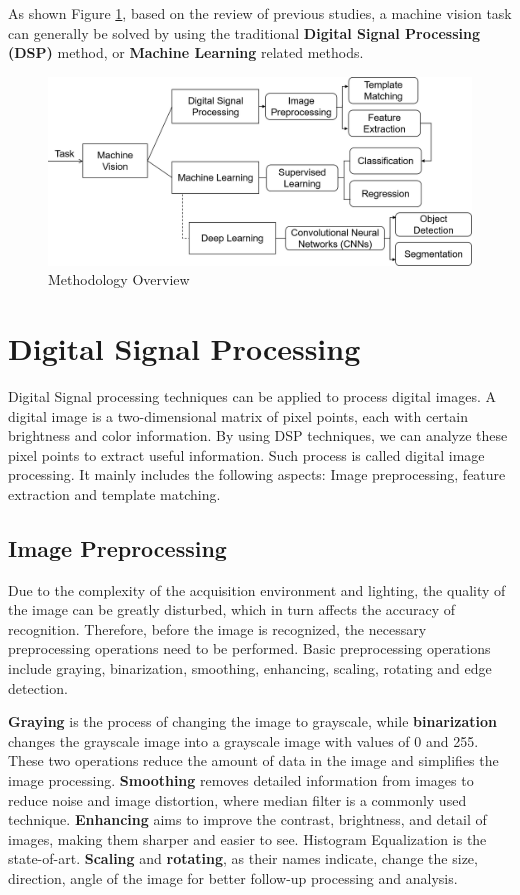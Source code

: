 As shown Figure \ref{fig:1}, based on the review of previous studies, a machine vision task can generally be solved by using the traditional \textbf{Digital Signal Processing (DSP)} method, or \textbf{Machine Learning} related methods.

\begin{figure}[h]
  \centering
  \includegraphics[width=1\textwidth]{Figures/Methodology Overview.png}
  \caption{Methodology Overview}
  \label{fig:1}
\end{figure}

\section{Digital Signal Processing}

Digital Signal processing techniques can be applied to process digital images. A digital image is a two-dimensional matrix of pixel points, each with certain brightness and color information. By using DSP techniques, we can analyze these pixel points to extract useful information. Such process is called digital image processing. It mainly includes the following aspects: Image preprocessing, feature extraction and template matching.

\subsection{Image Preprocessing}

Due to the complexity of the acquisition environment and lighting, the quality of the image can be greatly disturbed, which in turn affects the accuracy of recognition. Therefore, before the image is recognized, the necessary preprocessing operations need to be performed. Basic preprocessing operations include graying, binarization, smoothing, enhancing, scaling, rotating and edge detection.

\textbf{Graying} is the process of changing the image to grayscale, while \textbf{binarization} changes the grayscale image into a grayscale image with values of 0 and 255. These two operations reduce the amount of data in the image and simplifies the image processing. \textbf{Smoothing} removes detailed information from images to reduce noise and image distortion, where median filter is a commonly used technique. \textbf{Enhancing} aims to improve the contrast, brightness, and detail of images, making them sharper and easier to see. Histogram Equalization is the state-of-art. \textbf{Scaling} and \textbf{rotating}, as their names indicate, change the size, direction, angle of the image for better follow-up processing and analysis. 

